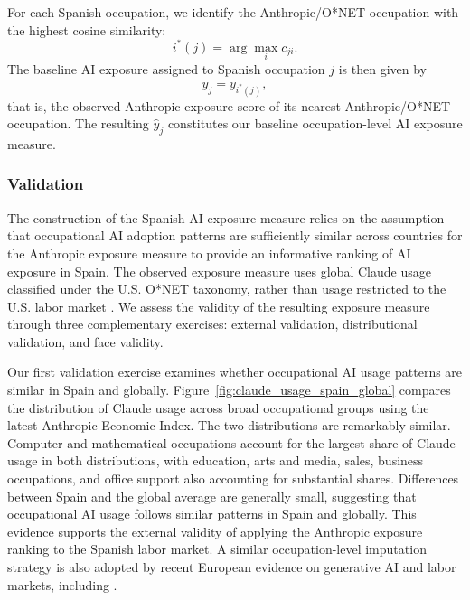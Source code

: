 \documentclass[11pt]{article}
\begin{document}

For each Spanish occupation, we identify the Anthropic/O*NET occupation with the highest cosine similarity:
\[
i^*(j)=\arg\max_i c_{ji}.
\]
The baseline AI exposure assigned to Spanish occupation $j$ is then given by
\[
\widehat{y}_j=y_{i^*(j)},
\]
that is, the observed Anthropic exposure score of its nearest Anthropic/O*NET occupation. The resulting $\widehat{y}_j$ constitutes our baseline occupation-level AI exposure measure.


\subsubsection{Validation}

The construction of the Spanish AI exposure measure relies on the assumption that occupational AI adoption patterns are sufficiently similar across countries for the Anthropic exposure measure to provide an informative ranking of AI exposure in Spain. The observed exposure measure uses global Claude usage classified under the U.S. O*NET taxonomy, rather than usage restricted to the U.S. labor market \citep{massenkoff_mccrory_2026}. We assess the validity of the resulting exposure measure through three complementary exercises: external validation, distributional validation, and face validity.

Our first validation exercise examines whether occupational AI usage patterns are similar in Spain and globally. Figure~\ref{fig:claude_usage_spain_global} compares the distribution of Claude usage across broad occupational groups using the latest Anthropic Economic Index. The two distributions are remarkably similar. Computer and mathematical occupations account for the largest share of Claude usage in both distributions, with education, arts and media, sales, business occupations, and office support also accounting for substantial shares. Differences between Spain and the global average are generally small, suggesting that occupational AI usage follows similar patterns in Spain and globally. This evidence supports the external validity of applying the Anthropic exposure ranking to the Spanish labor market. A similar occupation-level imputation strategy is also adopted by recent European evidence on generative AI and labor markets, including \citet{facius_iacono_2026}.
\end{document}
